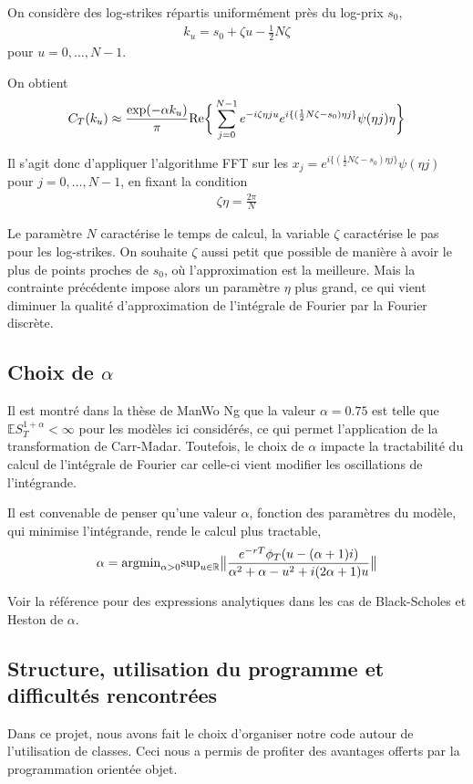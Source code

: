 \documentclass{article}
\begin{document}
On considère des log-strikes répartis uniformément près du log-prix $s_0$,
%
\begin{align*}
	k_u = s_0 + \zeta u - \frac{1}{2}N\zeta
\end{align*}
%
pour $u = 0, \ldots, N-1$.

On obtient
\begin{align*}
	C_T(k_u) \approx \frac{\exp(-\alpha k_u)}{\pi} \textup{Re}\bigg\{\sum_{j=0}^{N-1}e^{-i\zeta \eta j u} e^{i\{(\frac{1}{2}N\zeta-s_0)\eta j\}}\psi(\eta j)\eta\bigg\}
\end{align*}

Il s'agit donc d'appliquer l'algorithme FFT sur les $x_j= e^{i\{(\frac{1}{2}N\zeta-s_0)\eta j\}}\psi(\eta j)$ pour $j=0,\ldots, N-1$, en fixant la condition \begin{align*}
	\zeta \eta = \frac{2\pi}{N}
\end{align*}

Le paramètre $N$ caractérise le temps de calcul, la variable $\zeta$ caractérise le pas pour les log-strikes. On souhaite $\zeta$ aussi petit que possible de manière à avoir le plus de points proches de $s_0$, où l'approximation est la meilleure. Mais la contrainte précédente impose alors un paramètre $\eta$ plus grand, ce qui vient diminuer la qualité d'approximation de l'intégrale de Fourier par la Fourier discrète.

\subsection{Choix de $\alpha$}
Il est montré dans la thèse de ManWo Ng que la valeur $\alpha = 0.75$ est telle que $\mathbb{E}S_T^{1+\alpha} <\infty$ pour les modèles ici considérés, ce qui permet l'application de la transformation de Carr-Madar. Toutefois, le choix de $\alpha$ impacte la tractabilité du calcul de l'intégrale de Fourier car celle-ci vient modifier les oscillations de l'intégrande.

Il est convenable de penser qu'une valeur $\alpha$, fonction des paramètres du modèle, qui minimise l'intégrande, rende le calcul plus tractable, 
\begin{align*}
	\alpha = \textup{argmin}_{\alpha > 0} \textup{sup}_{u\in\mathbb{R}}\big\|\frac{e^{-rT}\phi_T(u-(\alpha+1)i)}{\alpha^2+\alpha-u^2+i(2\alpha+1)u}\big\|
\end{align*}

Voir la référence pour des expressions analytiques dans les cas de Black-Scholes et Heston de $\alpha$.
\subsection{Structure, utilisation du programme et difficultés rencontrées}
Dans ce projet, nous avons fait le choix d’organiser notre code autour de l’utilisation de classes. Ceci nous a permis de profiter des avantages offerts par la programmation orientée objet.
\end{document}
